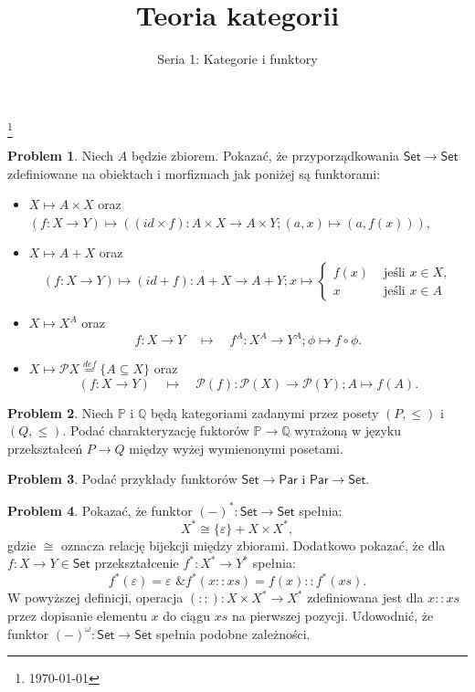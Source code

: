 \documentclass[10pt]{amsart}
\title{Teoria kategorii}
\author{Seria 1: Kategorie i funktory}
\theoremstyle{plain}
\theoremstyle{definition}
\newtheorem{problem}{Problem}
\numberwithin{equation}{section}
\newcommand\blfootnote[1]{%
  \begingroup
  \renewcommand\thefootnote{}\footnote{#1}%
  \addtocounter{footnote}{-1}%
  \endgroup
}
\begin{document}
\maketitle

\blfootnote{\today}


\begin{problem}
Niech $A$ będzie zbiorem. Pokazać, że przyporządkowania $\mathsf{Set}\to \mathsf{Set}$ zdefiniowane na obiektach i morfizmach jak poniżej są funktorami:
\begin{itemize}
\item $X\mapsto A\times X$ oraz $(f:X\to Y)\mapsto \left ((id \times f):A\times X\to A\times Y; (a,x)\mapsto (a,f(x))\right )$,
\item $X\mapsto A+ X$ oraz $$(f:X\to Y)\mapsto (id + f):A+ X\to A+ Y; x \mapsto \left \{ \begin{array}{cc}f(x)  &\text{ jeśli }x\in X, \\ x &\text{ jeśli }x\in A \end{array}\right. $$
\item $X\mapsto X^A$ oraz 
$$
f:X\to Y\quad \mapsto \quad f^A:X^A\to Y^A; \phi\mapsto f\circ \phi. 
$$
\item $X\mapsto \mathcal{P}X\stackrel{def}{=} \{ A\subseteq X \}$ oraz 
$$
(f:X\to Y)\quad \mapsto \quad \mathcal{P}(f):\mathcal{P}(X)\to \mathcal{P}(Y); A\mapsto f(A). 
$$
\end{itemize}
\end{problem}
%
\begin{problem}
Niech $\mathbb{P}$ i $\mathbb{Q}$ będą kategoriami zadanymi przez posety $(P,\leq)$ i $(Q,\leq)$. Podać charakteryzację fuktorów $\mathbb{P}\to \mathbb{Q}$ wyrażoną w języku przekształceń $P\to Q$ między wyżej wymienonymi posetami.
\end{problem}

\begin{problem}
Podać przykłady funktorów $\mathsf{Set}\to \mathsf{Par}$ i $\mathsf{Par}\to \mathsf{Set}$. 
\end{problem}

\begin{problem}
Pokazać, że funktor $(-)^\ast: \mathsf{Set}\to \mathsf{Set}$ spełnia:
$$
X^\ast \cong \{ \varepsilon \} + X\times X^\ast,
$$
gdzie $\cong$ oznacza relację bijekcji między zbiorami. Dodatkowo pokazać, że dla $f:X\to Y\in \mathsf{Set}$
przekształcenie $f^\ast: X^\ast \to Y^\ast$ spełnia:
$$
f^\ast (\varepsilon) = \varepsilon \text{ \& } f^\ast (x :: xs) = f(x) :: f^\ast (xs).
$$
W powyższej definicji, operacja $ (::) : X\times X^\ast \to X^\ast$ zdefiniowana jest dla $x :: xs$ przez dopisanie elementu $x$ do ciągu $xs$ na pierwszej pozycji. Udowodnić, że funktor $(-)^\omega : \mathsf{Set}\to \mathsf{Set}$ spełnia podobne zależności.
\end{problem}
\end{document}
